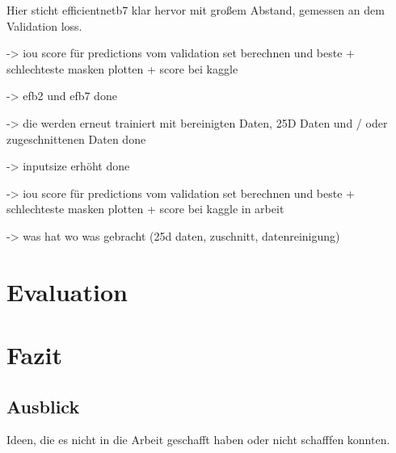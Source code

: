 Hier sticht efficientnetb7 klar hervor mit großem Abstand, gemessen an dem Validation loss. 

\begin{table}[H]
\caption{\label{tab:efb256}Baseline Performances nach Validation loss absteigend sortiert.}
\end{table}

-> iou score für predictions vom validation set berechnen und beste + schlechteste masken plotten + score bei kaggle 

-> efb2 und efb7 done

-> die werden erneut trainiert mit bereinigten Daten, 25D Daten und / oder zugeschnittenen Daten done

-> inputsize erhöht done

-> iou score für predictions vom validation set berechnen und beste + schlechteste masken plotten + score bei kaggle in arbeit

-> was hat wo was gebracht (25d daten, zuschnitt, datenreinigung) 

\section{Evaluation}\raggedbottom

\section{Fazit}\raggedbottom

\subsection{Ausblick}
Ideen, die es nicht in die Arbeit geschafft haben oder nicht schafffen konnten.


\pagebreak
